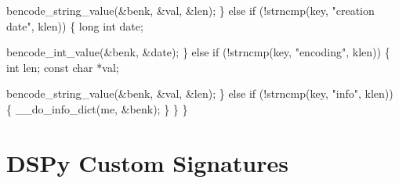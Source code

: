 \documentclass[
  a4paper,
]{scrreprt}
\newenvironment{Shaded}{\begin{snugshade}}{\end{snugshade}}
\newcommand{\ControlFlowTok}[1]{\textcolor[rgb]{0.85,0.12,0.09}{#1}}
\newcommand{\DataTypeTok}[1]{\textcolor[rgb]{0.47,0.16,0.63}{#1}}
\newcommand{\NormalTok}[1]{\textcolor[rgb]{0.33,0.33,0.33}{#1}}
\newcommand{\OperatorTok}[1]{\textcolor[rgb]{0.00,0.46,0.62}{#1}}
\newcommand{\StringTok}[1]{\textcolor[rgb]{0.00,0.50,0.00}{#1}}
\theoremstyle{definition}
\theoremstyle{remark}
\begin{document}
\begin{Shaded}
\begin{Highlighting}[numbers=left,,]
\NormalTok{            bencode\_string\_value}\OperatorTok{(\&}\NormalTok{benk}\OperatorTok{,} \OperatorTok{\&}\NormalTok{val}\OperatorTok{,} \OperatorTok{\&}\NormalTok{len}\OperatorTok{);}
        \OperatorTok{\}}
        \ControlFlowTok{else} \ControlFlowTok{if} \OperatorTok{(!}\NormalTok{strncmp}\OperatorTok{(}\NormalTok{key}\OperatorTok{,} \StringTok{"creation date"}\OperatorTok{,}\NormalTok{ klen}\OperatorTok{))}
        \OperatorTok{\{}
            \DataTypeTok{long} \DataTypeTok{int}\NormalTok{ date}\OperatorTok{;}

\NormalTok{            bencode\_int\_value}\OperatorTok{(\&}\NormalTok{benk}\OperatorTok{,} \OperatorTok{\&}\NormalTok{date}\OperatorTok{);}
        \OperatorTok{\}}
        \ControlFlowTok{else} \ControlFlowTok{if} \OperatorTok{(!}\NormalTok{strncmp}\OperatorTok{(}\NormalTok{key}\OperatorTok{,} \StringTok{"encoding"}\OperatorTok{,}\NormalTok{ klen}\OperatorTok{))}
        \OperatorTok{\{}
            \DataTypeTok{int}\NormalTok{ len}\OperatorTok{;}
            \DataTypeTok{const} \DataTypeTok{char} \OperatorTok{*}\NormalTok{val}\OperatorTok{;}

\NormalTok{            bencode\_string\_value}\OperatorTok{(\&}\NormalTok{benk}\OperatorTok{,} \OperatorTok{\&}\NormalTok{val}\OperatorTok{,} \OperatorTok{\&}\NormalTok{len}\OperatorTok{);}
        \OperatorTok{\}}
        \ControlFlowTok{else} \ControlFlowTok{if} \OperatorTok{(!}\NormalTok{strncmp}\OperatorTok{(}\NormalTok{key}\OperatorTok{,} \StringTok{"info"}\OperatorTok{,}\NormalTok{ klen}\OperatorTok{))}
        \OperatorTok{\{}
\NormalTok{            \_\_do\_info\_dict}\OperatorTok{(}\NormalTok{me}\OperatorTok{,} \OperatorTok{\&}\NormalTok{benk}\OperatorTok{);}
        \OperatorTok{\}}
    \OperatorTok{\}}
\OperatorTok{\}}
\end{Highlighting}
\end{Shaded}

\chapter{DSPy Custom Signatures}\label{sec-signatures}
\end{document}
